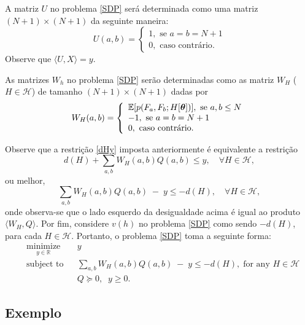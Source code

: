 \documentclass{amsart}
\theoremstyle{theorem}
\theoremstyle{definition}
\theoremstyle{remark}
\numberwithin{equation}{section}
\newcommand{\E}[1]{\mathbb{E}[#1]}
\newcommand{\bt}{\mbox{\boldmath{$\theta$}}}
\begin{document}
A matriz $U$ no problema \ref{SDP} ser\'{a} determinada como uma matriz $(N+1) \times (N+1)$ da seguinte maneira:
\begin{equation*}
  U(a,b) =
\left\{\begin{array}{l}
    1, \text{ se } a = b = N+1 \\
    0, \text{ caso contr\'{a}rio}.
\end{array}\right.
\end{equation*}
Observe que $\langle U,X \rangle = y$.

As matrizes $W_h$ no problema \ref{SDP} ser\~{a}o determinadas como as matriz $W_H$ ($H\in\mathcal{H}$) de tamanho $(N+1) \times (N+1)$ dadas por
\begin{equation*}
  W_{H}(a,b) =
\left\{\begin{array}{l}
    \E{p(F_a,F_b;H[\bt])}, \text{ se } a,b\leq N\\
    -1, \text{ se } a = b = N+1 \\
    0, \text{ caso contr\'{a}rio}.
\end{array}\right.
\end{equation*}

Observe que a restri\c{c}\~{a}o \ref{dHy} imposta anteriormente \'{e} equivalente a restri\c{c}\~{a}o
\begin{equation*}
   d(H) + \sum_{a,b} W_{H}(a,b) Q(a,b) \leq y, \quad \forall H\in\mathcal{H},
\end{equation*}
ou melhor,
\begin{equation*}
  \sum_{a,b} W_{H}(a,b) Q(a,b)\; - \;y \leq -d(H), \quad \forall H\in\mathcal{H},
\end{equation*}
onde observa-se que o lado esquerdo da desigualdade acima \'{e} igual ao produto $\langle W_{H},Q \rangle$. Por fim, considere $v(h)$ no problema \ref{SDP} como sendo $-d(H)$, para cada $H\in\mathcal{H}$. Portanto, o problema \ref{SDP} toma a seguinte forma:
\begin{equation}\label{SDPy}
\begin{aligned}
& \underset{y \in\mathbb{R}}{\text{minimize}} & & y \\
& \text{subject to} & & \displaystyle{\sum_{a,b} W_{H}(a,b) Q(a,b)}\; - \;y \leq -d(H), \; \text{for any } H \in\mathcal{H} \\
&&& Q \succeq 0,\;\;y \geq 0.
\end{aligned}
\end{equation}

\subsection{Exemplo}
\end{document}
